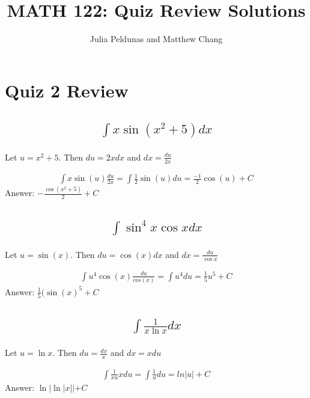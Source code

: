 \documentclass{article}
\title{MATH 122: Quiz Review Solutions}
\author{Julia Peldunas and Matthew Chang}
\begin{document}
\maketitle
\tableofcontents
\newpage

\section{Quiz 2 Review}
\subsection{
	\begin{align*}
		\int{x\sin{(x^2 + 5)}dx}
	\end{align*}
}

Let $u = x^2 + 5$. Then $du= 2x dx$ and $dx = \frac{du}{2x}$

\begin{align*}
	\int{x \sin{(u)} \frac{du}{2x}} = \int{\frac{1}{2} \sin{(u)} du} = \frac{-1}{2}  \cos{(u)} +C
\end{align*}
Answer: $-\frac{\cos{(x^2 +5)}}{2} + C$



\subsection{
	\begin{align*}
		\int{\sin^4{x}\cos{x}dx}
	\end{align*}
}

Let $u = \sin{(x)}$. Then $du = \cos{(x)} dx$ and $dx = \frac{du}{\cos{x}}$

\begin{align*}
	\int{u ^4 \cos{(x)} \frac{du}{cos{(x)}}} = \int{u^4 du} = \frac{1}{5}u^5 +C
\end{align*}
Answer: $\frac{1}{5}(\sin{(x)}^5 +C$




\subsection{
	\begin{align*}
		\int{\frac{1}{x\ln{x}}dx}
	\end{align*}
}

Let $u = \ln{x}$. Then $du = \frac{dx}{x}$ and $dx = xdu$

\begin{align*}
	\int{\frac{1}{xu} xdu} = \int {\frac{1}{u} du} = ln |u| + C
\end{align*}
Answer: $\ln{ |\ln{|x|}}| + C$
\end{document}
